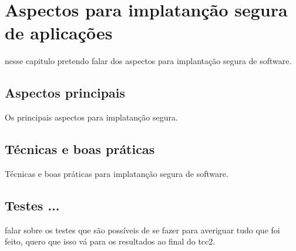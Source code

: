 \chapter{Aspectos para implatanção segura de aplicações}
\label{cap-seguranca}

nesse capitulo pretendo falar dos aspectos para implantação segura de software.

\section{Aspectos principais}

Os principais aspectos para implatanção segura.

\section{Técnicas e boas práticas}

Técnicas e boas práticas para implatanção segura de software.

\section{Testes ...}

falar sobre os testes que são possíveis de se fazer para averiguar tudo que foi
feito, quero que isso vá para os resultados ao final do tcc2.

%
